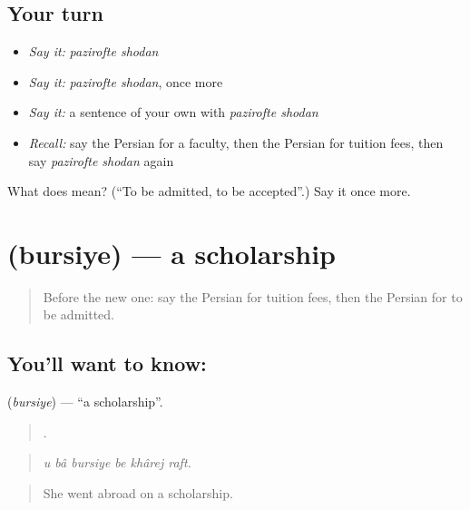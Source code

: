 \subsection*{Your turn}
\begin{itemize}
\raggedright
  \item \emph{Say it:} \emph{pazirofte shodan}
  \item \emph{Say it:} \emph{pazirofte shodan}, once more
  \item \emph{Say it:} a sentence of your own with \emph{pazirofte shodan}
  \item \emph{Recall:} say the Persian for a faculty, then the Persian for tuition fees, then say \emph{pazirofte shodan} again
\end{itemize}

\begin{tcolorbox}[breakable,colback=teal!4,colframe=teal!35!black,title={Before you move on}]
What does   mean? (\textquotedblleft{}To be admitted, to be accepted\textquotedblright{}.) Say it once more.
\end{tcolorbox}
\section[\texorpdfstring{\fa{بورسیه} (bursiye)}{بورسیه (bursiye)}]{ (bursiye) — a scholarship}

\label{lesson:FA-C400-bursiye}



\begin{quote}
Before the new one: say the Persian for tuition fees, then the Persian for to be admitted.
\end{quote}

\subsection*{You'll want to know: }
\textbf{} (\emph{bursiye}) — \textquotedblleft{}a scholarship\textquotedblright{}.

\begin{quote}
     .
\end{quote}

\begin{quote}
\emph{u bâ bursiye be khârej raft.}
\end{quote}

\begin{quote}
She went abroad on a scholarship.
\end{quote}

